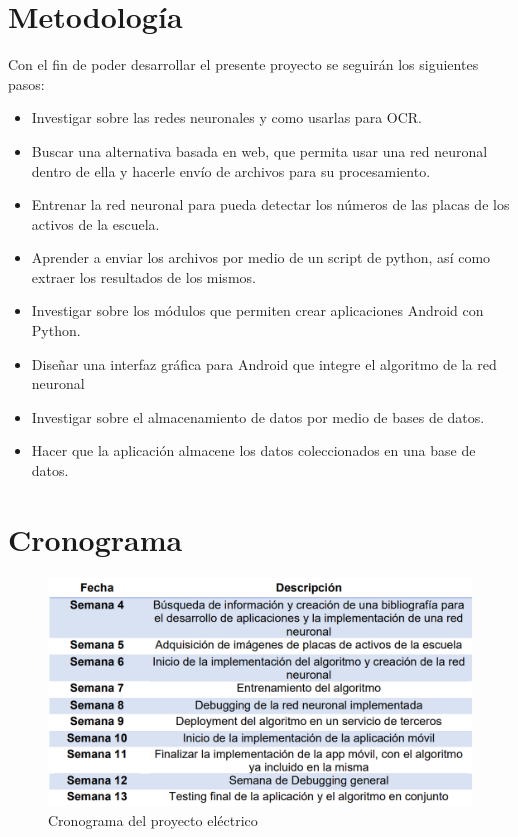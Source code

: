 \section{Metodología}
Con el fin de poder desarrollar el presente proyecto se seguirán los siguientes pasos:
\begin{itemize}
    \item Investigar sobre las redes neuronales y como usarlas para OCR.
    \item Buscar una alternativa basada en web, que permita usar una red neuronal dentro de ella y hacerle envío de archivos para su procesamiento.
    \item Entrenar la red neuronal para pueda detectar los números de las placas de los activos de la escuela.
    \item Aprender a enviar los archivos por medio de un script de python, así como extraer los resultados de los mismos.
    \item Investigar sobre los módulos que permiten crear aplicaciones Android con Python.
    \item Diseñar una interfaz gráfica para Android que integre el algoritmo de la red neuronal
    \item Investigar sobre el almacenamiento de datos por medio de bases de datos.
    \item Hacer que la aplicación almacene los datos coleccionados en una base de datos.
    
\end{itemize}

\section{Cronograma}
\begin{figure}[H]
\centering
\includegraphics[width=\textwidth]{imagenes/Cronograma.PNG} 
\caption{Cronograma del proyecto eléctrico}
\label{F:crono}
\end{figure}
